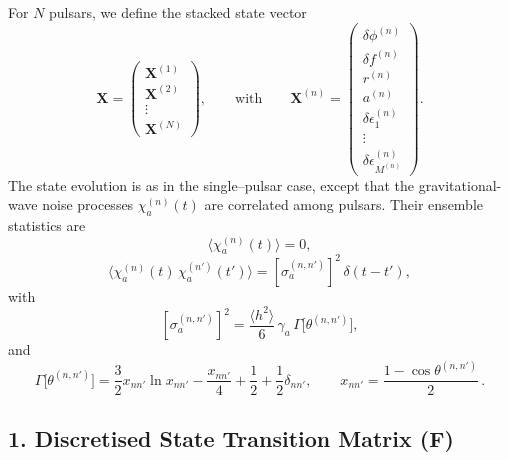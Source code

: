 \documentclass{tufte-handout} %
\begin{document}
	For $N$ pulsars, we define the stacked state vector
	\begin{equation}
		\boldsymbol{X} = \begin{pmatrix}
			\boldsymbol{X}^{(1)} \\
			\boldsymbol{X}^{(2)} \\
			\vdots \\
			\boldsymbol{X}^{(N)}
		\end{pmatrix}, \qquad \text{with} \qquad
		\boldsymbol{X}^{(n)} = \begin{pmatrix}
			\delta \phi^{(n)}\\[1mm]
			\delta f^{(n)}\\[1mm]
			r^{(n)}\\[1mm]
			a^{(n)}\\[1mm]
			\delta\epsilon_1^{(n)}\\[1mm]
			\vdots\\[1mm]
			\delta\epsilon_{M^{(n)}}^{(n)}
		\end{pmatrix}.
	\end{equation}
	The state evolution is as in the single--pulsar case, except that the gravitational-wave noise processes $\chi_a^{(n)}(t)$ are correlated among pulsars. Their ensemble statistics are
	\begin{equation}
		\langle \chi_a^{(n)}(t) \rangle = 0,
	\end{equation}
	\begin{equation}
		\langle \chi_a^{(n)}(t)\,\chi_a^{(n')}(t') \rangle = \left[\sigma_a^{(n,n')}\right]^2\,\delta(t-t'),
	\end{equation}
	with
	\begin{equation}
		\left[\sigma_a^{(n,n')}\right]^2 = \frac{\langle h^2 \rangle}{6}\,\gamma_a\,\Gamma\bigl[\theta^{(n,n')}\bigr],
	\end{equation}
	and
	\begin{equation}
		\Gamma\bigl[\theta^{(n,n')}\bigr] = \frac{3}{2}x_{nn'}\ln x_{nn'} - \frac{x_{nn'}}{4} + \frac{1}{2} + \frac{1}{2}\delta_{nn'}, \qquad x_{nn'}=\frac{1-\cos\theta^{(n,n')}}{2}\,.
	\end{equation}
	
	\subsection*{1. Discretised State Transition Matrix (\(\boldsymbol{F}\))}
	
\end{document}

